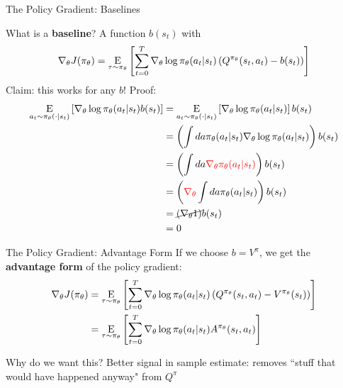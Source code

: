 \documentclass[9pt]{beamer}
\newcommand{\underE}[2]{\underset{\begin{subarray}{c}#1 \end{subarray}}{\E}\left[ #2 \right]}
\begin{document}
\begin{frame}{The Policy Gradient: Baselines}

What is a \textbf{baseline}? A function $b(s_t)$ with
%
\begin{equation*}
\nabla_{\theta} J(\pi_{\theta}) =\underE{\tau \sim \pi_{\theta}}{\sum_{t=0}^T \nabla_{\theta} \log \pi_{\theta}(a_t | s_t) \left(Q^{\pi_{\theta}}(s_t, a_t) - b(s_t)\right)}
\end{equation*}
%
Claim: this works for any $b$! Proof:
%
\begin{align*}
\underE{a_t \sim \pi_{\theta}(\cdot|s_t)}{\nabla_{\theta} \log \pi_{\theta}(a_t | s_t) b(s_t)} &= \underE{a_t \sim \pi_{\theta}(\cdot|s_t)}{\nabla_{\theta} \log \pi_{\theta}(a_t | s_t)} b(s_t) \\
&= \left(\int da \pi_{\theta}(a_t|s_t) \nabla_{\theta} \log \pi_{\theta}(a_t|s_t)\right) b(s_t) \\
&=  \left(\int da {\color{red} \nabla_{\theta} \pi_{\theta}(a_t|s_t) }\right) b(s_t) \\
&= \left({\color{red} \nabla_{\theta}}\int da \pi_{\theta}(a_t|s_t) \right) b(s_t) \\
&=\cancel{\left(\nabla_{\theta} 1 \right)} b(s_t) \\
&= 0
\end{align*}

\end{frame}

\begin{frame}{The Policy Gradient: Advantage Form}
If we choose $b = V^{\pi}$, we get the \textbf{advantage form} of the policy gradient:
%
\begin{align*}
\nabla_{\theta} J(\pi_{\theta}) &=\underE{\tau \sim \pi_{\theta}}{\sum_{t=0}^T \nabla_{\theta} \log \pi_{\theta}(a_t | s_t) \left(Q^{\pi_{\theta}}(s_t, a_t) - V^{\pi_{\theta}}(s_t)\right)}\\
 &=\underE{\tau \sim \pi_{\theta}}{\sum_{t=0}^T \nabla_{\theta} \log \pi_{\theta}(a_t | s_t) A^{\pi_{\theta}}(s_t, a_t)}
\end{align*}

Why do we want this? Better signal in sample estimate: removes ``stuff that would have happened anyway" from $Q^{\pi}$
\end{frame}
\end{document}
